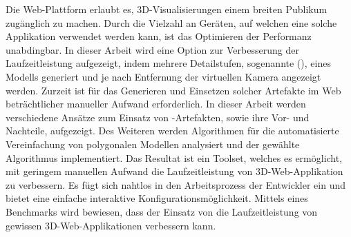 Die Web-Plattform erlaubt es, 3D-Visualisierungen einem breiten Publikum zugänglich zu machen. Durch die Vielzahl an Geräten, auf welchen eine solche Applikation verwendet werden kann, ist das Optimieren der Performanz unabdingbar. In dieser Arbeit wird eine Option zur Verbesserung der Laufzeitleistung aufgezeigt, indem mehrere Detailstufen, sogenannte  (), eines Modells generiert und je nach Entfernung der virtuellen Kamera angezeigt werden. Zurzeit ist für das Generieren und Einsetzen solcher Artefakte im Web beträchtlicher manueller Aufwand erforderlich.
\bigbreak
In dieser Arbeit werden verschiedene Ansätze zum Einsatz von -Artefakten, sowie ihre Vor- und Nachteile, aufgezeigt.
Des Weiteren werden Algorithmen für die automatisierte Vereinfachung von polygonalen Modellen analysiert und der gewählte Algorithmus implementiert.
\bigbreak
Das Resultat ist ein Toolset, welches es ermöglicht, mit geringem manuellen Aufwand die Laufzeitleistung von 3D-Web-Applikation zu verbessern.
Es fügt sich nahtlos in den Arbeitsprozess der Entwickler ein und bietet eine einfache interaktive Konfigurationsmöglichkeit.
Mittels eines Benchmarks wird bewiesen, dass der Einsatz von  die Laufzeitleistung von gewissen 3D-Web-Applikationen verbessern kann.

